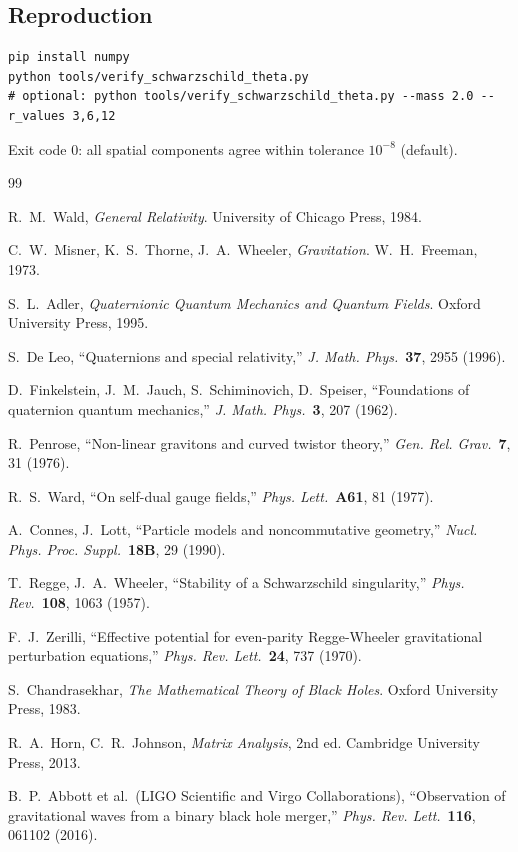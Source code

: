 \documentclass[12pt,a4paper]{article}
\theoremstyle{definition}
\theoremstyle{remark}
\begin{document}
\subsection{Reproduction}

\begin{verbatim}
pip install numpy
python tools/verify_schwarzschild_theta.py
# optional: python tools/verify_schwarzschild_theta.py --mass 2.0 --r_values 3,6,12
\end{verbatim}

Exit code 0: all spatial components agree within tolerance $10^{-8}$ (default).


\begin{thebibliography}{99}

R.~M.~Wald,
\textit{General Relativity}.
University of Chicago Press, 1984.

C.~W.~Misner, K.~S.~Thorne, J.~A.~Wheeler,
\textit{Gravitation}.
W.~H.~Freeman, 1973.

S.~L.~Adler,
\textit{Quaternionic Quantum Mechanics and Quantum Fields}.
Oxford University Press, 1995.

S.~De Leo,
``Quaternions and special relativity,''
\textit{J. Math. Phys.}\ \textbf{37}, 2955 (1996).

D.~Finkelstein, J.~M.~Jauch, S.~Schiminovich, D.~Speiser,
``Foundations of quaternion quantum mechanics,''
\textit{J. Math. Phys.}\ \textbf{3}, 207 (1962).

R.~Penrose,
``Non-linear gravitons and curved twistor theory,''
\textit{Gen. Rel. Grav.}\ \textbf{7}, 31 (1976).

R.~S.~Ward,
``On self-dual gauge fields,''
\textit{Phys. Lett.}\ \textbf{A61}, 81 (1977).

A.~Connes, J.~Lott,
``Particle models and noncommutative geometry,''
\textit{Nucl. Phys. Proc. Suppl.}\ \textbf{18B}, 29 (1990).

T.~Regge, J.~A.~Wheeler,
``Stability of a Schwarzschild singularity,''
\textit{Phys. Rev.}\ \textbf{108}, 1063 (1957).

F.~J.~Zerilli,
``Effective potential for even-parity Regge-Wheeler gravitational perturbation equations,''
\textit{Phys. Rev. Lett.}\ \textbf{24}, 737 (1970).

S.~Chandrasekhar,
\textit{The Mathematical Theory of Black Holes}.
Oxford University Press, 1983.

R.~A.~Horn, C.~R.~Johnson,
\textit{Matrix Analysis}, 2nd ed.
Cambridge University Press, 2013.

B.~P.~Abbott et al.\ (LIGO Scientific and Virgo Collaborations),
``Observation of gravitational waves from a binary black hole merger,''
\textit{Phys. Rev. Lett.}\ \textbf{116}, 061102 (2016).

\end{thebibliography}
\end{document}
